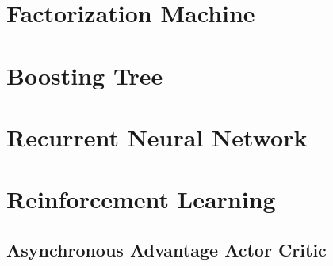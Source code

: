 \section{Factorization Machine}

\section{Boosting Tree}

\section{Recurrent Neural Network}

\section{Reinforcement Learning}

    \subsection{Asynchronous Advantage Actor Critic}
